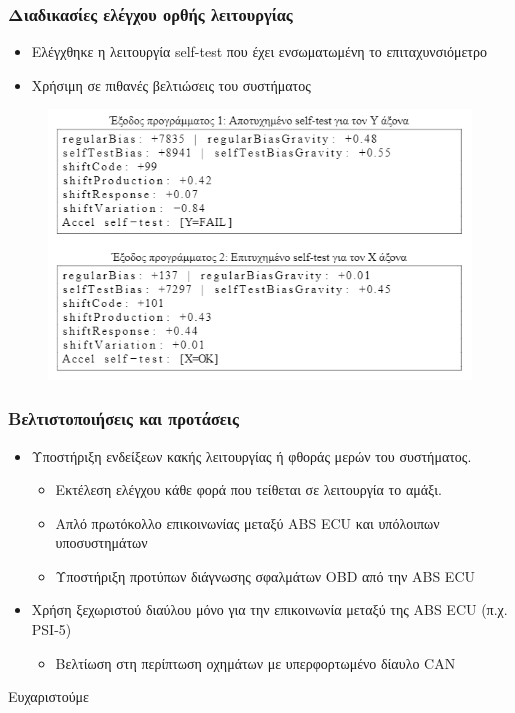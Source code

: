 \documentclass[fleqn]{beamer}
\begin{document}
\begin{frame}
  \frametitle{Διαδικασίες ελέγχου ορθής λειτουργίας}
  \begin{itemize}
      \item Ελέγχθηκε η λειτουργία self-test που έχει ενσωματωμένη το επιταχυνσιόμετρο
      \item Χρήσιμη σε πιθανές βελτιώσεις του συστήματος
  \end{itemize}
  \begin{figure}[h]
    \begin{center}
    \includegraphics[scale=0.60]{images/self-test-log.png}
    \end{center}
\end{figure}
\end{frame}

\begin{frame}
  \frametitle{Βελτιστοποιήσεις και προτάσεις}
  \begin{itemize}
    \item Υποστήριξη ενδείξεων κακής λειτουργίας ή φθοράς μερών του συστήματος.
        \begin{itemize}
            \item Εκτέλεση ελέγχου κάθε φορά που τείθεται σε λειτουργία το αμάξι.
            \item Απλό πρωτόκολλο επικοινωνίας μεταξύ ABS ECU και υπόλοιπων υποσυστημάτων
            \item Υποστήριξη προτύπων διάγνωσης σφαλμάτων OBD από την ABS ECU
        \end{itemize}
    \item Χρήση ξεχωριστού διαύλου μόνο για την επικοινωνία μεταξύ της ABS ECU (π.χ. PSI-5)
        \begin{itemize}
            \item Βελτίωση στη περίπτωση οχημάτων με υπερφορτωμένο δίαυλο CAN
        \end{itemize}
  \end{itemize}
\end{frame}

\begin{frame}
\begin{center}
    Ευχαριστούμε
\end{center}
\end{frame}
\end{document}
